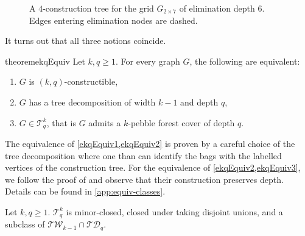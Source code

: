 \documentclass[a4paper,UKenglish,cleveref, autoref, thm-restate]{lipics-v2021}
\newcommand{\TW}{\ensuremath{\mathcal{TW}}}
\newcommand{\TD}{\ensuremath{\mathcal{TD}}}
\newcommand{\Ekq}{\ensuremath{\mathcal{T}_{q}^{k}}}
\newcommand{\elimOrd}[2]{$(#1,#2)$-constructible}
\newcommand{\grid}[2]{\ensuremath{G_{#1 \times #2}}}
\begin{document}
\begin{figure}
	\caption{A $4$-construction tree for the grid $\grid{2}{7}$ of elimination depth $6$. Edges entering elimination nodes are dashed.}
	\label{fig:elim-example}
\end{figure}

 
It turns out that all three notions coincide.

\begin{restatable}{theorem}{ekqEquiv}
	\label{thm:Ekq_equiv}
	Let $k, q\geq 1$. For every graph $G$, the following are equivalent:
	\begin{enumerate}
		\item $G$ is \elimOrd{k}{q},\label{ekqEquiv1}
		\item $G$ has a tree decomposition of width $k-1$ and depth $q$,\label{ekqEquiv2}
		\item $G\in\Ekq$, that is $G$ admits a $k$-pebble forest cover of depth $q$.\label{ekqEquiv3}
	\end{enumerate}
\end{restatable}

The equivalence of \cref{ekqEquiv1,ekqEquiv2} is proven by a careful choice of the tree decomposition where one than can identify the bags with the labelled vertices of the construction tree. For the equivalence of \cref{ekqEquiv2,ekqEquiv3}, we follow the proof of \cite[Theorem~19]{abramsky_relating_2021} and observe that their construction preserves depth. Details can be found in \cref{app:equiv-classes}.

\begin{corollary}
	\label{cor:Ekq-subset-tw-td}
	\label{cor:minor-closed}
	Let $k, q\geq 1$.
	$\Ekq $ is minor-closed, closed under taking disjoint unions, and a subclass of $\TW_{k-1}\cap\TD_q$.
\end{corollary}
\end{document}

